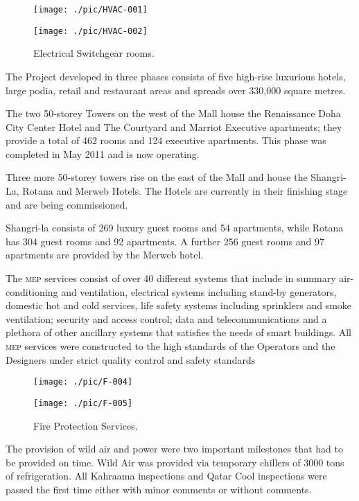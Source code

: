 \documentclass[justified, 11pt, a4paper]{tufte-book}
\begin{document}
\begin{fullwidth}
\begin{figure*}[btp]
\texttt{[image: ./pic/HVAC-001]}
\vspace*{1pt}

\texttt{[image: ./pic/HVAC-002]}
\vspace*{1pt}

\caption{Electrical Switchgear rooms.}
\end{figure*}
\end{fullwidth}
The Project developed in three phases consists of five high-rise luxurious hotels, large podia,
retail and restaurant areas and spreads over 330,000 square metres. 

The two 50-storey Towers on the west of the Mall house the Renaissance Doha City Center Hotel and The Courtyard and Marriot Executive apartments; they provide a total of 462 rooms and 124 executive apartments. This phase was completed in May 2011 and is now operating.

Three more 50-storey towers rise on the east of the Mall and house the Shangri-La, Rotana and Merweb Hotels. The Hotels are currently in their finishing stage and are being commissioned.

Shangri-la consists of  269 luxury guest rooms and 54 apartments, while Rotana  has 304 guest rooms and 92 apartments. A further 256 guest rooms and 97 apartments are provided by the Merweb hotel.

The \textsc{mep} services consist of over 40 different systems that include in summary air-conditioning and ventilation, electrical systems including stand-by generators, domestic hot and cold services,  life safety systems including sprinklers and smoke ventilation; security and access control; data and telecommunications and a plethora of other ancillary systems that satisfies the needs of smart buildings. All \textsc{mep} services were constructed to the high standards of the Operators and the Designers under strict quality control and safety standards



\begin{fullwidth}
\begin{figure*}[btp]
\texttt{[image: ./pic/F-004]}
\vspace*{1pt}

\texttt{[image: ./pic/F-005]}
\vspace*{1pt}

\caption{Fire Protection Services.}
\end{figure*}
\end{fullwidth}
The provision of wild air and power were two important milestones that had to be provided on time. Wild Air was provided via temporary chillers of 3000 tons of refrigeration.
 All Kahraama inspections and Qatar Cool inspections were passed the first time either with minor comments or without comments.
\end{document}
